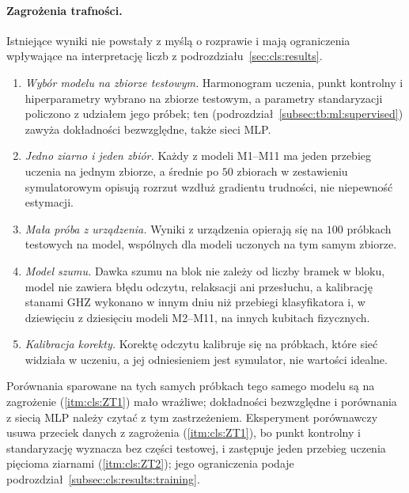 \paragraph{Zagrożenia trafności.}
Istniejące wyniki nie powstały z myślą o rozprawie i mają ograniczenia wpływające na interpretację liczb z podrozdziału~\ref{sec:cls:results}.
\begin{enumerate}
\renewcommand{\theenumi}{ZT\arabic{enumi}}
\renewcommand{\labelenumi}{(\theenumi)}
\item\label{itm:cls:ZT1} \emph{Wybór modelu na zbiorze testowym.}
Harmonogram uczenia, punkt kontrolny i hiperparametry wybrano na zbiorze testowym, a parametry standaryzacji policzono z udziałem jego próbek; ten  (podrozdział~\ref{subsec:tb:ml:supervised}) zawyża dokładności bezwzględne, także sieci MLP.
\item\label{itm:cls:ZT2} \emph{Jedno ziarno i jeden zbiór.}
Każdy z modeli M1--M11 ma jeden przebieg uczenia na jednym zbiorze, a średnie po $50$ zbiorach w zestawieniu symulatorowym opisują rozrzut wzdłuż gradientu trudności, nie niepewność estymacji.
\item\label{itm:cls:ZT3} \emph{Mała próba z urządzenia.}
Wyniki z urządzenia opierają się na $100$ próbkach testowych na model, wspólnych dla modeli uczonych na tym samym zbiorze.
\item\label{itm:cls:ZT4} \emph{Model szumu.}
Dawka szumu na blok nie zależy od liczby bramek w bloku, model nie zawiera błędu odczytu, relaksacji ani przesłuchu, a kalibrację stanami GHZ wykonano w innym dniu niż przebiegi klasyfikatora i, w dziewięciu z dziesięciu modeli M2--M11, na innych kubitach fizycznych.
\item\label{itm:cls:ZT5} \emph{Kalibracja korekty.}
Korektę odczytu kalibruje się na próbkach, które sieć widziała w uczeniu, a jej odniesieniem jest symulator, nie wartości idealne.
\end{enumerate}
Porównania sparowane na tych samych próbkach tego samego modelu są na zagrożenie (\ref{itm:cls:ZT1}) mało wrażliwe; dokładności bezwzględne i porównania z siecią MLP należy czytać z tym zastrzeżeniem.
Eksperyment porównawczy usuwa przeciek danych z zagrożenia (\ref{itm:cls:ZT1}), bo punkt kontrolny i standaryzację wyznacza bez części testowej, i zastępuje jeden przebieg uczenia pięcioma ziarnami (\ref{itm:cls:ZT2}); jego ograniczenia podaje podrozdział~\ref{subsec:cls:results:training}.

